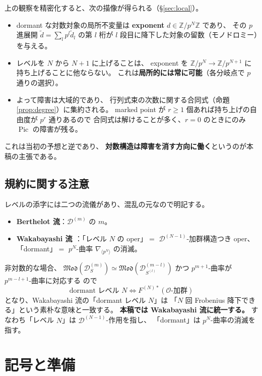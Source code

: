\documentclass[a4paper,11pt]{ltjsarticle}
\theoremstyle{plain}
\theoremstyle{definition}
\newcommand{\bbZ}{\mathbb{Z}}
\newcommand{\cD}{\mathcal{D}}
\newcommand{\cO}{\mathcal{O}}
\newcommand{\Pic}{\operatorname{Pic}}
\begin{document}
上の観察を精密化すると、次の描像が得られる（\S\ref{sec:local}）。
\begin{itemize}[leftmargin=1.6em]
\item dormant な対数対象の局所不変量は
      \textbf{exponent} $d\in\bbZ/p^{N}\bbZ$ であり、
      その $p$ 進展開 $\tilde d=\sum_{l}p^l\tilde d_l$ の第 $l$ 桁が
      $l$ 段目に降下した対象の留数（モノドロミー）を与える。
\item レベルを $N$ から $N+1$ に上げることは、
      exponent を $\bbZ/p^{N}\to\bbZ/p^{N+1}$ に持ち上げることに他ならない。
      これは\textbf{局所的には常に可能}（各分岐点で $p$ 通りの選択）。
\item よって障害は大域的であり、
      行列式束の次数に関する合同式（命題 \ref{prop:degree}）に集約される。
      marked point が $r\ge1$ 個あれば持ち上げの自由度が $p^r$ 通りあるので
      合同式は解けることが多く、$r=0$ のときにのみ $\Pic$ の障害が残る。
\end{itemize}
これは当初の予想と逆であり、
\textbf{対数構造は障害を消す方向に働く}というのが本稿の主張である。

\subsection{規約に関する注意}\label{ss:convention}

レベルの添字には二つの流儀があり、混乱の元なので明記する。
\begin{itemize}[leftmargin=1.6em]
\item \textbf{Berthelot 流}：$\cD^{(m)}$ の $m$。
\item \textbf{Wakabayashi 流 \cite{Wak}}：「レベル $N$ の oper」$=$ $\cD^{(N-1)}$-加群構造つき oper、
      「dormant」$=$ $p^N$-曲率 $\nabla_{\langle p^N\rangle}$ の消滅。
\end{itemize}
非対数的な場合、
$\mathfrak{Mod}(\cD^{(m)}_S)\simeq\mathfrak{Mod}(\cD^{(m-l)}_{S^{(l)}})$ かつ
$p^{m+1}$-曲率が $p^{m-l+1}$-曲率に対応する \cite[Prop.~2.1.5]{Wak} ので
\[
  \text{dormant レベル }N \iff F^{(N)*}(\cO\text{-加群})
\]
となり、Wakabayashi 流の「dormant レベル $N$」は
「$N$ 回 Frobenius 降下できる」という素朴な意味と一致する。
\textbf{本稿では Wakabayashi 流に統一する。}
すなわち「レベル $N$」は $\cD^{(N-1)}$-作用を指し、
「dormant」は $p^N$-曲率の消滅を指す。

\section{記号と準備}\label{sec:notation}
\end{document}

